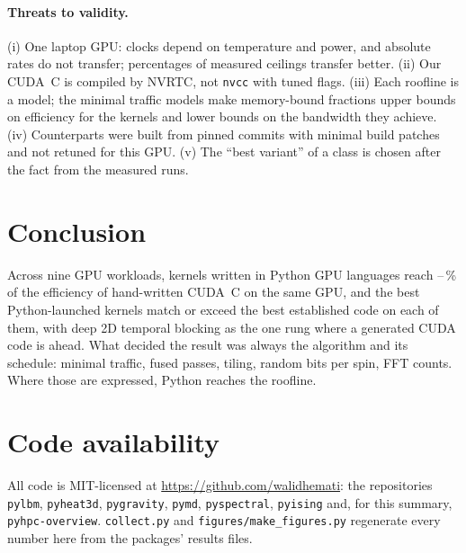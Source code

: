 \documentclass[11pt]{article}
\begin{document}
\paragraph{Threats to validity.} (i) One laptop GPU: clocks depend on temperature and power, and
absolute rates do not transfer; percentages of measured ceilings transfer better. (ii) Our
CUDA~C is compiled by NVRTC, not \texttt{nvcc} with tuned flags. (iii) Each roofline is a model;
the minimal traffic models make memory-bound fractions upper bounds on efficiency for the
kernels and lower bounds on the bandwidth they achieve. (iv) Counterparts were built from pinned
commits with minimal build patches and not retuned for this GPU. (v) The ``best variant'' of a
class is chosen after the fact from the measured runs.

\section{Conclusion}
Across nine GPU workloads, kernels written in Python GPU languages reach
\dslOverCudaMin--\dslOverCudaMax\,\% of the efficiency of hand-written CUDA~C on the same GPU,
and the best Python-launched kernels match or exceed the best established code on each of
them, with deep 2D temporal blocking as the one rung where a generated CUDA code is ahead. What
decided the result was always the algorithm and its schedule: minimal traffic, fused passes,
tiling, random bits per spin, FFT counts. Where those are expressed, Python reaches the
roofline.

\section*{Code availability}
All code is MIT-licensed at \url{https://github.com/walidhemati}: the repositories
\texttt{pylbm}, \texttt{pyheat3d}, \texttt{pygravity}, \texttt{pymd}, \texttt{pyspectral},
\texttt{pyising} and, for this summary, \texttt{pyhpc-overview}.
\texttt{collect.py} and \texttt{figures/make\_figures.py} regenerate every number here from the
packages' results files.



\end{document}
